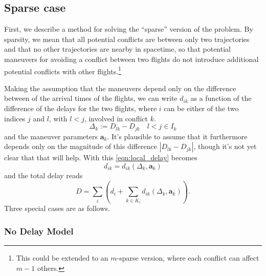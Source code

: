 \documentclass{article}
\begin{document}
\subsection{Sparse case}
First, we describe a method for solving the ``sparse'' version of the problem.
By sparsity, we mean that all potential conflicts are between only two
trajectories and that no other trajectories are nearby in spacetime, so that
potential maneuvers for avoiding a conflict between two flights do not
introduce additional potential conflicts with other flights.\footnote{This
could be extended to an $m$-sparse version, where each conflict can affect
$m-1$ others.}

Making the assumption that the maneuvers depend only on the difference
between of the arrival times of the flights, 
we can write $d_{ik}$ as a function of the difference of the delays 
for the two flights, where $i$ can be either of the two indices $j$ and $l$, 
with $l<j$, involved in conflict $k$.
\begin{equation*}
    \Delta_{k} := D_{lk} - D_{jk} \quad l < j \in I_k
\end{equation*}
and the maneuver parameters $\mathbf{a}_k$.
It's plausible to assume that it furthermore depends only on the magnitude of this difference $|D_{lk} - D_{jk}|$, though it's not yet clear that that will help.
With this \eqref{eqn:local_delay} becomes
\begin{equation*}
    d_{ik} = d_{ik}(\Delta_{k}, \mathbf{a}_k) 
\end{equation*}
and the total delay reads
\begin{equation*}
    D = \sum_i \left(d_i + \sum_{k\in K_i} d_{ik} (\Delta_k, \mathbf{a}_k)\right).
\end{equation*}
Three special cases are as follows. 

\subsubsection{No Delay Model}
\end{document}
